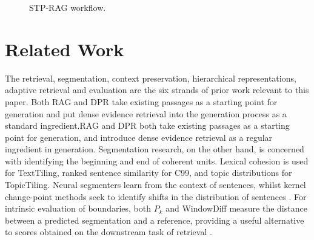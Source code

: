 \documentclass[10pt,a4paper]{article}
\begin{document}
\begin{figure}[!htbp]
\centering
{}
\caption{STP-RAG workflow.}
\label{fig:architecture}
\end{figure}

\section{Related Work}
\label{sec:related}

The retrieval, segmentation, context preservation, hierarchical representations, adaptive retrieval and evaluation are the six strands of prior work relevant to this paper. Both RAG and DPR take existing passages as a starting point for generation and put dense evidence retrieval into the generation process as a standard ingredient.RAG and DPR both take existing passages as a starting point for generation, and introduce dense evidence retrieval as a regular ingredient in generation. Segmentation research, on the other hand, is concerned with identifying the beginning and end of coherent units. Lexical cohesion is used for TextTiling, ranked sentence similarity for C99, and topic distributions for TopicTiling. Neural segmenters learn from the context of sentences, whilst kernel change-point methods seek to identify shifts in the distribution of sentences \cite{riedl2012topictiling,choi2000c99,hearst1997texttiling,arlot2019kernelchangepoint,koshorek2018textseg,lo2021transformer2}. For intrinsic evaluation of boundaries, both $P_k$ and WindowDiff measure the distance between a predicted segmentation and a reference, providing a useful alternative to scores obtained on the downstream task of retrieval \cite{beeferman1999statistical,pevzner2002windowdiff}.
\end{document}
